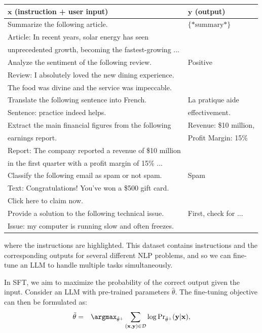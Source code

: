 \begin{center}
\begin{tabular}{l | l}
$\mathbf{x}$ (instruction + user input) & $\mathbf{y}$ (output) \\ \hline
\colorbox{gray!30}{Summarize the following article.} & $\{*\textrm{summary}*\}$ \\
Article: In recent years, solar energy has seen  & \\
unprecedented growth, becoming the fastest-growing ... & \\ \hline
\colorbox{gray!30}{Analyze the sentiment of the following review.} & Positive \\
Review: I absolutely loved the new dining experience. & \\
The food was divine and the service was impeccable. & \\ \hline
\colorbox{gray!30}{Translate the following sentence into French.} & La pratique aide \\
Sentence: practice indeed helps. & effectivement. \\ \hline
\colorbox{gray!30}{Extract the main financial figures from the following} & Revenue: \$10 million, \\
\colorbox{gray!30}{earnings report.} & Profit Margin: 15\% \\
Report: The company reported a revenue of \$10 million\\
in the first quarter with a profit margin of 15\% ... \\ \hline
\colorbox{gray!30}{Classify the following email as spam or not spam.} & Spam \\
Text: Congratulations! You've won a \$500 gift card. \\
Click here to claim now. \\ \hline
\colorbox{gray!30}{Provide a solution to the following technical issue.} & First, check for ... \\
Issue: my computer is running slow and often freezes. &
\end{tabular}
\end{center}

\noindent where the instructions are highlighted. This dataset contains instructions and the corresponding outputs for several different NLP problems, and so we can fine-tune an LLM to handle multiple tasks simultaneously.

In SFT, we aim to maximize the probability of the correct output given the input. Consider an LLM with pre-trained parameters $\hat{\theta}$. The fine-tuning objective can then be formulated as:
\begin{eqnarray}
\tilde{\theta} & = & \argmax_{\hat{\theta}^+} \sum_{(\mathbf{x},\mathbf{y}) \in \mathcal{D}} \log \mathrm{Pr}_{\hat{\theta}^+}(\mathbf{y}|\mathbf{x}), \label{eq:instruction-fine-tuning}
\end{eqnarray}

